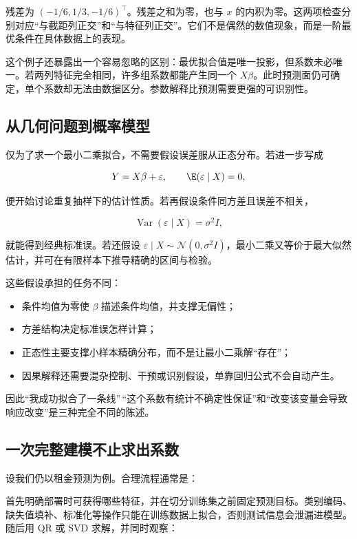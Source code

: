 残差为 \((-1/6,1/3,-1/6)^\top\)。残差之和为零，也与 \(x\) 的内积为零。这两项检查分别对应``与截距列正交''和``与特征列正交''。它们不是偶然的数值现象，而是一阶最优条件在具体数据上的表现。

这个例子还暴露出一个容易忽略的区别：最优拟合值是唯一投影，但系数未必唯一。若两列特征完全相同，许多组系数都能产生同一个 \(X\beta\)。此时预测面仍可确定，单个系数却无法由数据区分。参数解释比预测需要更强的可识别性。

\subsection{从几何问题到概率模型}

仅为了求一个最小二乘拟合，不需要假设误差服从正态分布。若进一步写成

\[
Y=X\beta+\varepsilon,\qquad
\E(\varepsilon\mid X)=0,
\]

便开始讨论重复抽样下的估计性质。若再假设条件同方差且误差不相关，

\[
\operatorname{Var}(\varepsilon\mid X)=\sigma^2I,
\]

就能得到经典标准误。若还假设 \(\varepsilon\mid X\sim\mathcal N(0,\sigma^2I)\)，最小二乘又等价于最大似然估计，并可在有限样本下推导精确的区间与检验。

这些假设承担的任务不同：

\begin{itemize}
\tightlist
\item
  条件均值为零使 \(\beta\) 描述条件均值，并支撑无偏性；
\item
  方差结构决定标准误怎样计算；
\item
  正态性主要支撑小样本精确分布，而不是让最小二乘解``存在''；
\item
  因果解释还需要混杂控制、干预或识别假设，单靠回归公式不会自动产生。
\end{itemize}

因此``我成功拟合了一条线''\,``这个系数有统计不确定性保证''和``改变该变量会导致响应改变''是三种完全不同的陈述。

\subsection{一次完整建模不止求出系数}

设我们仍以租金预测为例。合理流程通常是：

首先明确部署时可获得哪些特征，并在切分训练集之前固定预测目标。类别编码、缺失值填补、标准化等操作只能在训练数据上拟合，否则测试信息会泄漏进模型。随后用 QR 或 SVD 求解，并同时观察：

